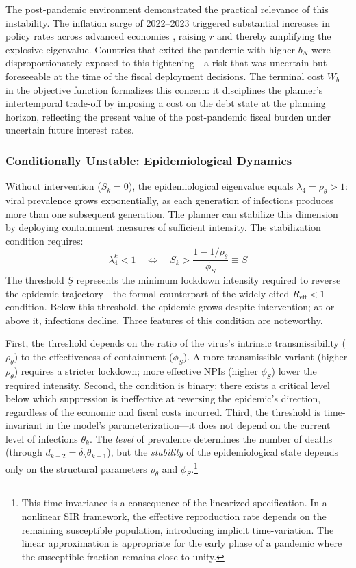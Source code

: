 \documentclass[12pt, a4paper]{article}
\begin{document}
The post-pandemic environment demonstrated the practical relevance of this instability.
The inflation surge of 2022--2023 triggered substantial increases in policy rates across
advanced economies \citep{jorda2023}, raising $r$ and thereby amplifying the explosive
eigenvalue. Countries that exited the pandemic with higher $b_N$ were
disproportionately exposed to this tightening---a risk that was uncertain but
foreseeable at the time of the fiscal deployment decisions. The terminal cost $W_b$ in
the objective function formalizes this concern: it disciplines the planner's
intertemporal trade-off by imposing a cost on the debt state at the planning horizon,
reflecting the present value of the post-pandemic fiscal burden under uncertain future
interest rates.

\subsubsection{Conditionally Unstable: Epidemiological Dynamics}

Without intervention ($S_k = 0$), the epidemiological eigenvalue equals $\lambda_4 =
\rho_\theta > 1$: viral prevalence grows exponentially, as each generation of
infections produces more than one subsequent generation. The planner can stabilize
this dimension by deploying containment measures of sufficient intensity. The
stabilization condition requires:
%
\begin{equation}
    \lambda_4^k < 1 \quad \Longleftrightarrow \quad
    S_k > \frac{1 - 1/\rho_\theta}{\phi_S}
    \equiv \underline{S}
    \label{eq:S_threshold}
\end{equation}
%
The threshold $\underline{S}$ represents the minimum lockdown intensity required to
reverse the epidemic trajectory---the formal counterpart of the widely cited
$R_{\text{eff}} < 1$ condition. Below this threshold, the epidemic grows despite
intervention; at or above it, infections decline. Three features of this condition are
noteworthy.

First, the threshold depends on the ratio of the virus's intrinsic transmissibility
($\rho_\theta$) to the effectiveness of containment ($\phi_S$). A more transmissible
variant (higher $\rho_\theta$) requires a stricter lockdown; more effective NPIs (higher
$\phi_S$) lower the required intensity. Second, the condition is binary: there exists a
critical level below which suppression is ineffective at reversing the epidemic's
direction, regardless of the economic and fiscal costs incurred. Third, the threshold is
time-invariant in the model's parameterization---it does not depend on the current level
of infections $\theta_k$. The \textit{level} of prevalence determines the number of
deaths (through $d_{k+2} = \delta_\theta \theta_{k+1}$), but the \textit{stability} of
the epidemiological state depends only on the structural parameters $\rho_\theta$ and
$\phi_S$.\footnote{This time-invariance is a consequence of the linearized
specification. In a nonlinear SIR framework, the effective reproduction rate depends on
the remaining susceptible population, introducing implicit time-variation. The linear
approximation is appropriate for the early phase of a pandemic where the susceptible
fraction remains close to unity.}
\end{document}
